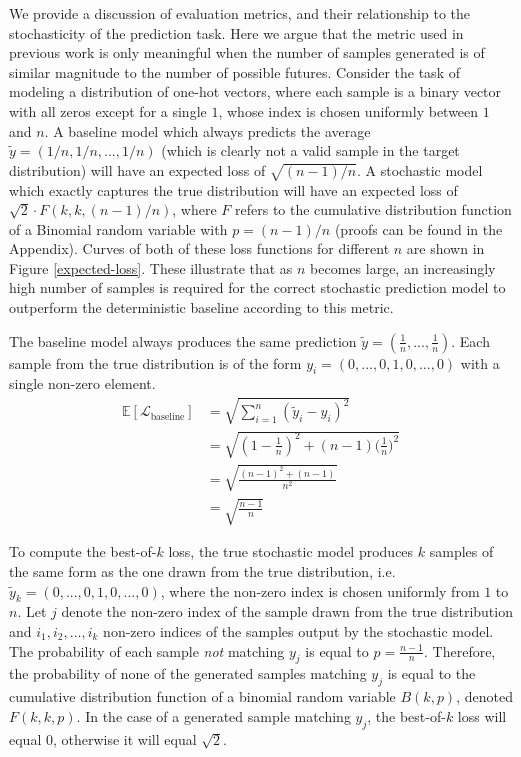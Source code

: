 \documentclass{article}
\begin{document}
We provide a discussion of evaluation metrics, and their relationship to the stochasticity of the prediction task.
Here we argue that the metric used in previous work \citep{Walker2016, Babaeizadeh2018, Denton2018} is only meaningful when the number of samples generated is of similar magnitude to the number of possible futures.
Consider the task of modeling a distribution of one-hot vectors, where each sample is a binary vector with all zeros except for a single $1$, whose index is chosen uniformly between $1$ and $n$.
A baseline model which always predicts the average $\tilde{y} = (1/n, 1/n, ..., 1/n)$ (which is clearly not a valid sample in the target distribution) will have an expected loss of $\sqrt{(n-1)/n}$. A stochastic model which exactly captures the true distribution will have an expected loss of $\sqrt{2} \cdot F(k, k, (n-1)/n)$, where $F$ refers to the cumulative distribution function of a Binomial random variable with $p=(n-1)/n$ (proofs can be found in the Appendix).
Curves of both of these loss functions for different $n$ are shown in Figure \ref{expected-loss}.
These illustrate that as $n$ becomes large, an increasingly high number of samples is required for the correct stochastic prediction model to outperform the deterministic baseline according to this metric.


The baseline model always produces the same prediction $\tilde{y} = (\frac{1}{n}, ..., \frac{1}{n})$. Each sample from the true distribution is of the form $y_i = (0, ..., 0, 1, 0, ..., 0)$ with a single non-zero element.
\begin{align}
  \mathbb{E}[\mathcal{L}_{\mbox{baseline}}] &= \sqrt{\sum_{i=1}^n (\tilde{y}_i - y_i)^2} \\
  &= \sqrt{(1-\frac{1}{n})^2 + (n-1)\Big ( \frac{1}{n} \Big )^2} \\
  &= \sqrt{\frac{(n-1)^2 + (n-1)}{n^2}} \\
  &= \sqrt{\frac{n-1}{n}}
\end{align}

To compute the best-of-$k$ loss, the true stochastic model produces $k$ samples of the same form as the one drawn from the true distribution, i.e. $\tilde{y}_k = (0, ..., 0, 1, 0, ..., 0)$, where the non-zero index is chosen uniformly from $1$ to $n$.
Let $j$ denote the non-zero index of the sample drawn from the true distribution and $i_1, i_2, ..., i_k$ non-zero indices of the samples output by the stochastic model.
The probability of each sample \textit{not} matching $y_j$ is equal to $p=\frac{n-1}{n}$.
Therefore, the probability of none of the generated samples matching $y_j$ is equal to the cumulative distribution function of a binomial random variable $B(k, p)$, denoted $F(k, k, p)$.
In the case of a generated sample matching $y_j$, the best-of-$k$ loss will equal 0, otherwise it will equal $\sqrt{2}$.
\end{document}
